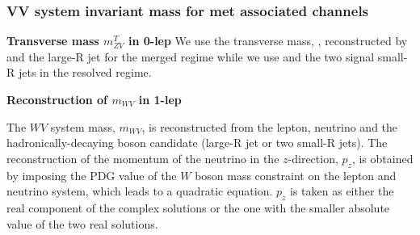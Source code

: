 



\subsubsection{VV system invariant mass for met associated channels}
\label{subsubsec:mVV_reconstruction}


\textbf{Transverse mass $m^T_{ZV}$ in 0-lep}
We use the transverse mass, \mt, reconstructed by \met and the large-R jet for the merged regime while we use \met and the two signal small-R jets in the resolved regime.

\textbf{Reconstruction of $m_{WV}$ in 1-lep} 

The $WV$ system mass, $m_{WV}$, is reconstructed from the lepton, neutrino and the hadronically-decaying boson candidate (large-R jet or two small-R jets).
The reconstruction of the momentum of the neutrino in the $z$-direction, $p_z$, is obtained by imposing the PDG value of the $W$ boson mass constraint on the lepton and neutrino system, which leads to a quadratic equation. $p_z$ is taken as either the real component of the complex solutions or the one with the smaller absolute value of the two real solutions.




